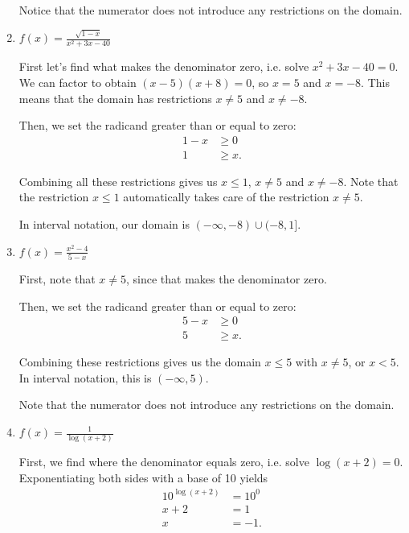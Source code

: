 \documentclass{ximera}
\begin{document}
\begin{enumerate}
\begin{expandable}
\begin{explanation}
Notice that the numerator does not introduce any restrictions on the domain. 
			\end{explanation}
		\end{expandable}
	\item $f(x) = \frac{\sqrt{1-x}}{x^2 + 3x - 40}$
		\begin{expandable}
			\begin{explanation}
First let's find what makes the denominator zero, i.e. solve $x^2 + 3x - 40 = 0$. We can factor to obtain $(x - 5)(x + 8) = 0$, so $x = 5$ and $x = -8$. This means that the domain has restrictions $x \ne 5$ and $x \ne -8$. 

Then, we set the radicand greater than or equal to zero: \begin{align*}1 - x&\ge 0 \\ 1 & \ge x. \end{align*}

Combining all these restrictions gives us $x \le 1$, $x \ne 5$ and $x \ne -8$. Note that the restriction $x \le 1$ automatically takes care of the restriction $x \ne 5$. 

In interval notation, our domain is $(- \infty, -8) \cup (-8, 1]$. 
			\end{explanation}
		\end{expandable}
	\item $f(x) = \frac{x^2 - 4}{5 - x}$
		\begin{expandable}
			\begin{explanation}
First, note that $x \ne 5$, since that makes the denominator zero.

Then, we set the radicand greater than or equal to zero: \begin{align*}5 - x&\ge 0 \\ 5 & \ge x. \end{align*}

Combining these restrictions gives us the domain $x \le 5$ with $x \ne 5$, or $x < 5$. In interval notation, this is $(-\infty, 5)$.

Note that the numerator does not introduce any restrictions on the domain. 
			\end{explanation}
		\end{expandable}
	\item $f(x) = \frac{1}{\log(x + 2)}$
		\begin{expandable}
			\begin{explanation}
First, we find where the denominator equals zero, i.e. solve $\log(x + 2) = 0$. Exponentiating both sides with a base of 10 yields \begin{align*}10^{\log(x + 2)} & = 10^0 \\ x + 2 & = 1 \\ x & = -1. \end{align*}


\end{explanation}
\end{expandable}
\end{enumerate}
\end{document}

